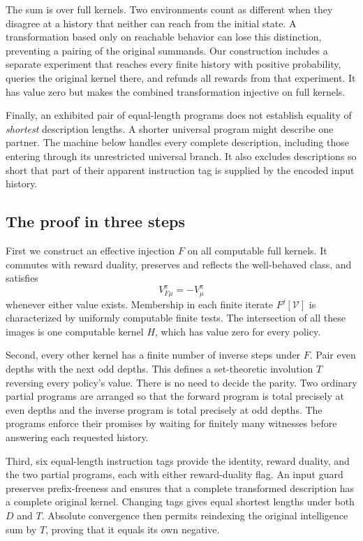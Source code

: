 \documentclass[11pt]{article}
\theoremstyle{definition}
\theoremstyle{remark}
\newcommand{\V}{\mathcal V}
\begin{document}
The sum is over full kernels.  Two environments count as different when
they disagree at a history that neither can reach from the initial
state.  A transformation based only on reachable behavior can lose this
distinction, preventing a pairing of the original summands.  Our
construction includes a separate experiment that reaches every finite
history with positive probability, queries the original kernel there,
and refunds all rewards from that experiment.  It has value zero but
makes the combined transformation injective on full kernels.

Finally, an exhibited pair of equal-length programs does not establish
equality of \emph{shortest} description lengths.  A shorter universal
program might describe one partner.  The machine below handles every
complete description, including those entering through its unrestricted
universal branch.  It also excludes descriptions so short that part of
their apparent instruction tag is supplied by the encoded input history.

\subsection*{The proof in three steps}

First we construct an effective injection $F$ on all computable full
kernels.  It commutes with reward duality, preserves and reflects the
well-behaved class, and satisfies
\[
  V_{F\mu}^{\pi}=-V_{\mu}^{\pi}
\]
whenever either value exists.  Membership in each finite iterate
$F^j[\V]$ is characterized by uniformly computable finite tests.  The
intersection of all these images is one computable kernel $H$, which
has value zero for every policy.

Second, every other kernel has a finite number of inverse steps under
$F$.  Pair even depths with the next odd depths.  This defines a
set-theoretic involution $T$ reversing every policy's value.  There is no
need to decide the parity.  Two ordinary partial programs are arranged
so that the forward program is total precisely at even depths and the
inverse program is total precisely at odd depths.  The programs enforce
their promises by waiting for finitely many witnesses before answering
each requested history.

Third, six equal-length instruction tags provide the identity, reward
duality, and the two partial programs, each with either reward-duality
flag.  An input guard preserves prefix-freeness and ensures that a
complete transformed description has a complete original kernel.
Changing tags gives equal shortest lengths under both $D$ and $T$.
Absolute convergence then permits reindexing the original intelligence
sum by $T$, proving that it equals its own negative.
\end{document}
